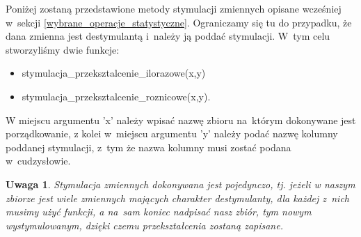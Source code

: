 \documentclass[12pt,a4paper]{report}
\newtheorem{uwaga}{Uwaga}
\begin{document}
{Poniżej zostaną przedstawione metody stymulacji zmiennych opisane wcześniej w~sekcji \ref{wybrane_operacje_statystyczne}. Ograniczamy
się tu do przypadku, że dana zmienna jest destymulantą i~należy
ją poddać stymulacji. W~tym celu stworzyliśmy dwie funkcje:
\begin{itemize}
\item stymulacja\_przeksztalcenie\_ilorazowe(x,y)
\item stymulacja\_przeksztalcenie\_roznicowe(x,y).
\end{itemize}
W miejscu argumentu 'x'
należy wpisać nazwę zbioru na~którym dokonywane jest porządkowanie, z
kolei w~miejscu argumentu 'y' należy podać nazwę kolumny poddanej
stymulacji, z~tym że nazwa kolumny musi zostać podana w~cudzysłowie.

\begin{Shaded}
\begin{Highlighting}[]
\NormalTok{\{}
  \NormalTok{:}
  \NormalTok{\{}
    \NormalTok{x[i,}\NormalTok{(}\NormalTok{(x)==y)]=}\NormalTok{/x[i,}\NormalTok{(}\NormalTok{(x)==y)]}
  \NormalTok{\}}
\NormalTok{\}}
\end{Highlighting}
\end{Shaded}

\begin{Shaded}
\begin{Highlighting}[]
\NormalTok{\{}
  \NormalTok{(x[}\NormalTok{(}\NormalTok{(x)==y)])}
  \NormalTok{:}
  \NormalTok{\{}
    \NormalTok{x[i,}\NormalTok{(}\NormalTok{(x)==y)]=max_wartosc-x[i,}\NormalTok{(}\NormalTok{(x)==y)]}
  \NormalTok{\}}
\NormalTok{\}}
\end{Highlighting}
\end{Shaded}

\begin{uwaga} Stymulacja zmiennych dokonywana jest pojedynczo, tj. jeżeli w
naszym zbiorze jest wiele zmiennych mających charakter destymulanty, dla
każdej z~nich musimy użyć funkcji, a na~sam koniec nadpisać nasz zbiór,
tym nowym wystymulowanym, dzięki czemu przekształcenia zostaną zapisane.
\end{uwaga}

}
\end{document}
